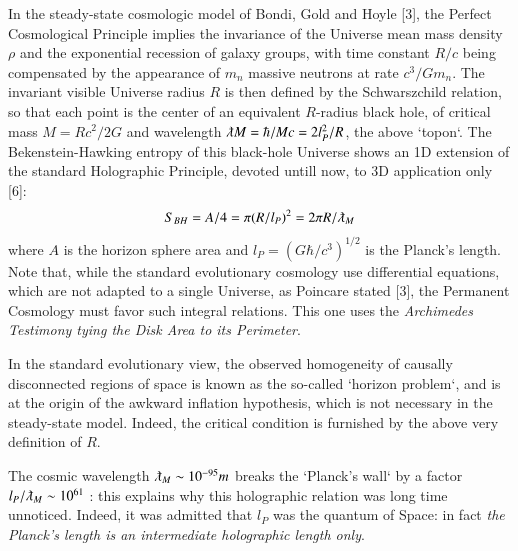 \documentclass[twoside,draft]{article}
\begin{document}
\begin{sloppypar}
{In the steady-state cosmologic model of Bondi, Gold and Hoyle [3], the Perfect Cosmological
Principle implies the invariance of the Universe mean mass density $\rho$ and the exponential recession
of galaxy groups, with time constant $R/c$ being compensated by the appearance of $m_n$ massive
neutrons at rate $c^{3} /Gm_{n}$. The invariant visible Universe radius $R$ is then defined by the
Schwarszchild relation, so that each point is the center of an equivalent $R$-radius black hole, of
critical mass $M = Rc^{2} /2G$ and wavelength $\lambdabar M = \hbar/Mc = 2l_{P}^{2} /R$, the above `topon`. The Bekenstein-Hawking entropy of this black-hole Universe shows an 1D extension of the standard Holographic
Principle, devoted untill now, to 3D application only [6]:
\begin{equation}
S_{BH} = A/4 = \pi(R/l_{P})^{2} = 2\pi R/\lambdabar_{M}
\end{equation}
where $A$ is the horizon sphere area and $l_{P} = (G\hbar/c^{3} )^{1/2}$ is the Planck's length. Note that, while the standard evolutionary cosmology use differential equations, which are not adapted to a single Universe, as Poincare stated [3], the Permanent Cosmology must favor such integral relations. This one
uses the \textit{Archimedes Testimony tying the Disk Area to its Perimeter}.

In the standard evolutionary view, the observed homogeneity of causally disconnected regions
of space is known as the so-called `horizon problem`, and is at the origin of the awkward inflation
hypothesis, which is not necessary in the steady-state model. Indeed, the critical condition is
furnished by the above very definition of $R$.

The cosmic wavelength
$\lambdabar_{M}\sim 10^{-95} m$ breaks the `Planck's wall` by a factor $l_{P}/\lambdabar_{M}\sim 10^{61}$ : this explains why this holographic relation was long time unnoticed. Indeed, it was admitted that $l_{P}$ was the quantum of Space: in fact \textit{the Planck's length is an intermediate holographic length only}.

}
\end{sloppypar}
\end{document}
